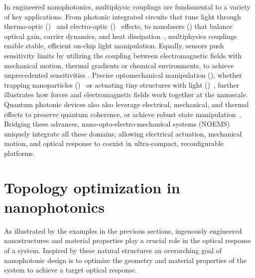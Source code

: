 In engineered nanophotonics, multiphysic couplings are fundamental to a variety of key applications. From photonic integrated circuits that tune light through  
thermo-optic ()~\cite{TOPS_1, TOPS_2, TOPS_3, program, PIC} and electro-optic ()~\cite{modu, modu1, modu2, pockels} effects, to nanolasers () that balance optical gain, carrier dynamics, and heat dissipation~\cite{laser,laser_pic}, multiphysics couplings enable stable, efficient on-chip light manipulation. Equally, sensors  
push sensitivity limits by utilizing the coupling between electromagnetic fields with mechanical motion, thermal gradients or chemical environments, to achieve unprecedented sensitivities \cite{therm_sensing,sensing, weakforce}.
Precise optomechanical manipulation (), whether trapping nanoparticles ()~\cite{ashkin_acceleration_1970} or actuating tiny structures with light ()~\cite{ivanyi_optically_2024}, further illustrates how forces and electromagnetic fields work together at the nanoscale. Quantum photonic devices also
also leverage electrical, mechanical, and thermal effects to preserve quantum coherence, or achieve robust state manipulation~\cite{quant_eo, Andrews_2014, Xi_2025}. Bridging these advances, nano-opto-electro-mechanical systems (NOEMS)~\cite{NOEMS} uniquely integrate all these  
domains, allowing electrical actuation, mechanical motion, and optical response to coexist in ultra-compact, reconfigurable platforms. 



\section{Topology optimization in nanophotonics}

As illustrated by the examples in the previous sections, ingenously engineered nanostructures and material properties play a crucial role in the
optical response of a system. Inspired by these natural structures an overarching goal of nanophotonic
design is to optimize the geometry and material properties of the system to achieve a target
optical response.

